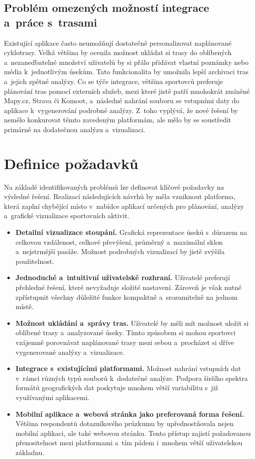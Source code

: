 \subsection{Problém omezených možností integrace a~práce s~trasami}
\label{the-problem-of-limited-integration-options-and-working-with-routes}

Existující aplikace často neumožňují dostatečně personalizovat naplánované cyklotrasy.
Velká většina by ocenila možnost ukládat si trasy do oblíbených a~nezanedbatelné množství uživatelů by si přálo přidávat vlastní poznámky nebo média k~jednotlivým úsekům.
Tato funkcionalita by umožnila lepší archivaci tras a~jejich zpětné analýzy.
Co se týče integrace, většina sportovců preferuje plánování tras pomocí externích služeb, mezi které jistě patří mnohokrát zmíněné Mapy.cz, Strava či Komoot, a~následné nahrání souboru se vstupními daty do aplikace k~vygenerování podrobné analýzy.
Z~toho vyplývá, že nové řešení by nemělo konkurovat těmto zavedeným platformám, ale mělo by se soustředit primárně na dodatečnou analýzu a~vizualizaci.

\section{Definice požadavků}
\label{requirements-definition}

Na základě identifikovaných problémů lze definovat klíčové požadavky na výsledné řešení.
Realizací následujících návrhů by měla vzniknout platforma, která zaplní chybějící místo v~nabídce aplikací určených pro plánování, analýzy a~grafické vizualizace sportovních aktivit.

\begin{itemize}
    \item \textbf{Detailní vizualizace stoupání.}
    Grafická reprezentace úseků s~důrazem na celkovou vzdálenost, celkové převýšení, průměrný a~maximální sklon a~nejstrmější pasáže.
    Možnost podrobných vizualizací by jistě zvýšila použitelnost.
    \item \textbf{Jednoduché a~intuitivní uživatelské rozhraní.}
    Uživatelé preferují přehledné řešení, které nevyžaduje složité nastavení.
    Zároveň je však nutné zpřístupnit všechny důležité funkce kompaktně a~srozumitelně na jednom místě.
    \item \textbf{Možnost ukládání a~správy tras.}
    Uživatelé by měli mít možnost uložit si oblíbené trasy a~analyzované úseky.
    Tímto způsobem si mohou sportovci vzájemně porovnávat naplánované trasy mezi sebou a~procházet si dříve vygenerované analýzy a~vizualizace.
    \item \textbf{Integrace s~existujícími platformami.}
    Možnost nahrání vstupních dat v~rámci různých typů souborů k~dodatečné analýze.
    Podpora širšího spektra formátů geografických dat poskytuje mnohem větší variabilitu s~již využívanými aplikacemi.
    \item \textbf{Mobilní aplikace a~webová stránka jako preferovaná forma řešení.}
    Většina respondentů dotazníkového průzkumu by upřednostňovala nejen mobilní aplikaci, ale také webovou stránku.
    Tento přístup zajistí požadovanou přenositelnost mezi platformami a~tím pádem i~mnohem větší uživatelskou základnu.
\end{itemize}


